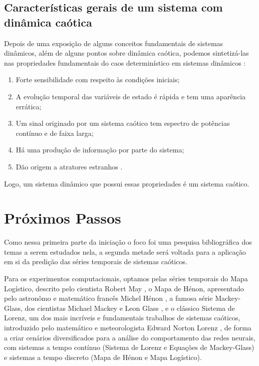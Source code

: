 \documentclass[a4paper, 12pt]{article}
\begin{document}
\subsection{Características gerais de um sistema com dinâmica caótica}
Depois de uma exposição de alguns conceitos fundamentais de sistemas dinâmicos, além de alguns pontos sobre dinâmica caótica, podemos sintetizá-las nas propriedades fundamentais do caos determinístico em sistemas dinâmicos \cite{attux2001dinamica}:
\begin{enumerate}
\item Forte sensibilidade com respeito às condições iniciais;
\item A evolução temporal das variáveis de estado é rápida e tem uma aparência errática;
\item Um sinal originado por um sistema caótico tem espectro de potências contínuo e de faixa larga;
\item Há uma produção de informação por parte do sistema;
\item Dão origem a atratores estranhos \cite{ruelle1971nature}.
\end{enumerate}

Logo, um sistema dinâmico que possui essas propriedades é um sistema caótico.

\section{Próximos Passos}

Como nessa primeira parte da iniciação o foco foi uma pesquisa bibliográfica dos temas a serem estudados nela, a segunda metade será voltada para a aplicação em si da predição das séries temporais de sistemas caóticos.

Para os experimentos computacionais, optamos pelas séries temporais do Mapa Logístico, descrito pelo cientista Robert May \cite{may1976simple}, o Mapa de Hénon, apresentado pelo astronômo e matemático francês Michel Hénon \cite{henon1976two}, a famosa série Mackey-Glass, dos cientistas Michael Mackey e Leon Glass \cite{mackey1977oscillation}, e o clássico Sistema de Lorenz, um dos  mais incríveis e fundamentais trabalhos de sistemas caóticos, introduzido pelo matemático e meteorologista Edward Norton Lorenz \cite{lorenz1963deterministic}, de forma a criar cenários diversificados para a análise do comportamento das redes neurais, com sistemas a tempo contínuo (Sistema de Lorenz e Equações de Mackey-Glass) e sistemas a tempo discreto (Mapa de Hénon e Mapa Logístico).
\end{document}
